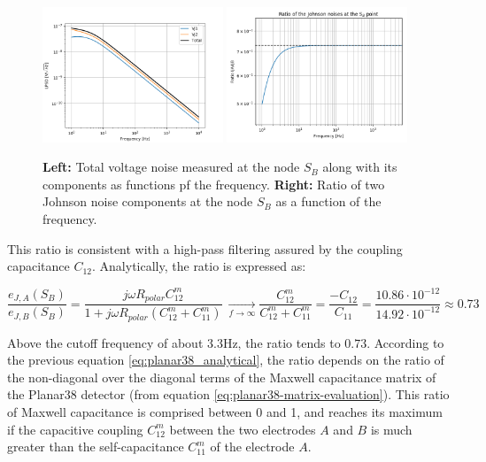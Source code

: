 \begin{figure}
\centering
\includegraphics[width=0.48\textwidth]{Figures/Electrodes/planar38_johnson_propagation.png}
\includegraphics[width=0.48\textwidth]{Figures/Electrodes/planar38_comparison_johnson.png}
\caption{
\textbf{Left:} Total voltage noise measured at the node $S_B$ along with its components as functions pf the frequency.
\textbf{Right:} Ratio of two Johnson noise components at the node $S_B$ as a function of the frequency.
}
\label{fig:planar38-analytical-results}
\end{figure}

This ratio is consistent with a high-pass filtering assured by the coupling capacitance $C_{12}$. Analytically, the ratio is expressed as:

\begin{equation}
\label{eq:planar38_analytical}
\frac{e_{J,A}(S_B)}{e_{J,B}(S_B)}
=
  \frac{ j \omega R_{polar} C_{12}^m }{ 1 + j \omega R_{polar} \left( C_{12}^m + C_{11}^m \right) } \
\xrightarrow[{f\to \infty}]{}
  \frac{ C_{12}^m }{ C_{12}^m + C_{11}^m }
=
  \frac{ -C_{12} }{ C_{11} }
=
  \frac{ 10.86 \cdot 10^{-12} }{ 14.92 \cdot 10^{-12} }
\approx
  0.73
\end{equation}

Above the cutoff frequency of about $3.3$Hz, the ratio tends to $0.73$. According to the previous equation \ref{eq:planar38_analytical}, the ratio depends on the ratio of the non-diagonal over the diagonal terms of the Maxwell capacitance matrix of the Planar38 detector (from equation \ref{eq:planar38-matrix-evaluation}). This ratio of Maxwell capacitance is comprised between 0 and 1, and reaches its maximum if the capacitive coupling $C_{12}^m$ between the two electrodes $A$ and $B$ is much greater than the self-capacitance $C_{11}^m$ of the electrode $A$.

